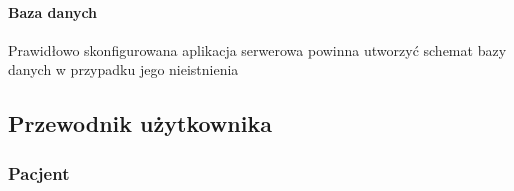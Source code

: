 \documentclass[polish,12pt]{aghthesis}
\begin{document}
\paragraph{Baza danych}{Prawidłowo skonfigurowana aplikacja serwerowa powinna utworzyć schemat bazy danych w przypadku jego nieistnienia}


\subsection{Przewodnik użytkownika}
\subsubsection{Pacjent}
\end{document}
